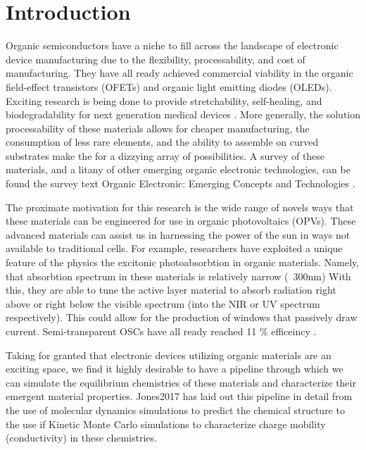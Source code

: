 \chapter{Introduction} 
Organic semiconductors have a niche to fill across the landscape of electronic
device manufacturing due to the flexibility, processability, and cost of manufacturing. They have all ready
achieved commercial viability in the organic field-effect transistors (OFETs) and organic light emitting
diodes (OLEDs).
Exciting research is being done to provide stretchability, self-healing, and biodegradability for 
next generation medical devices \cite{Brutting2006}.
More generally, the solution processability of these materials allows for
cheaper manufacturing, the consumption of less rare elements, and the ability to assemble on curved substrates make the for a dizzying array of possibilities. A survey of these materials, and a litany of
other emerging organic electronic technologies, can be found the survey text 
Organic Electronic: Emerging Concepts and Technologies
\cite{FabioCicoiraEditor2013}. 

The proximate motivation for this research is the wide range of novels ways that these materials can be
engineered for use in organic photovoltaics (OPVs). These advanced materials
can assist us in harnessing the power of the sun in ways not available to traditional cells. 
For example, researchers have exploited a unique feature of the physics the excitonic photoabsorbtion in 
organic materials.  Namely, that absorbtion spectrum
in these materials is relatively narrow (~300nm)
With this, they are able to tune the active layer material to absorb radiation right above or right below the
visible spectrum (into the NIR or UV spectrum respectively). This 
could allow for the production of windows that passively draw current. Semi-transparent OSCs have all ready
reached 11 \% efficeincy \cite{Brabec2020}. 

Taking for granted that electronic devices utilizing organic materials are an exciting
space, we find it highly desirable to have a pipeline through which we can simulate the equilibrium
chemistries of these materials and characterize their emergent material properties. Jones2017 has laid out this
pipeline in detail from the use of molecular dynamics simulations to predict the chemical structure to the use
if Kinetic Monte Carlo simulations to characterize charge mobility (conductivity) in these chemistries.

